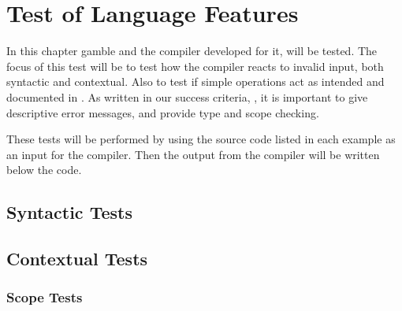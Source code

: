 \chapter{Test of Language Features}
\label{cha:test_of_language_features}
In this chapter \gls{gamble} and the compiler developed for it, will be tested.
The focus of this test will be to test how the compiler reacts to invalid input, both syntactic and contextual.
Also to test if simple operations act as intended and documented in . 
As written in our success criteria, , it is important to give descriptive error messages, and provide type and scope checking. 

These tests will be performed by using the source code listed in each example as an input for the compiler. 
Then the output from the compiler will be written below the code. 

\section{Syntactic Tests}

\section{Contextual Tests}

\subsection*{Scope Tests}

